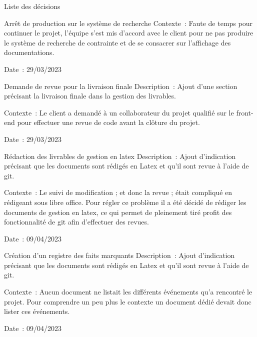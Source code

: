 \documentclass[]{article}
\begin{document}
{\begin{section}{Liste des décisions}
\begin{subsection}{Arrêt de production sur le système de recherche}
     Contexte : Faute de temps pour continuer le projet, l’équipe s’est mis d’accord avec le client pour ne pas produire le système de recherche de contrainte et de se consacrer sur l’affichage des documentations.

     Date : 29/03/2023
 \end{subsection}
 \newpage
 \begin{subsection}{Demande de revue pour la livraison finale}
     Description : Ajout d’une section précisant la livraison finale dans la gestion des livrables.

     Contexte : Le client a demandé à un collaborateur du projet qualifié sur le front-end pour effectuer une revue de code avant la clôture du projet.

     Date : 29/03/2023
 \end{subsection}

 \begin{subsection}{Rédaction des livrables de gestion en latex}
    Description : Ajout d'indication précisant que les documents sont rédigés en Latex et qu'il sont revue à l'aide de git.

    Contexte : Le suivi de modification ; et donc la revue ; était compliqué en rédigeant sous libre office. Pour régler ce problème il a été décidé de rédiger
    les documents de gestion en latex, ce qui permet de pleinement tiré profit des fonctionnalité de git afin d'effectuer des revues.

    Date : 09/04/2023
\end{subsection}

\begin{subsection}{Création d'un registre des faits marquants}
    Description : Ajout d'indication précisant que les documents sont rédigés en Latex et qu'il sont revue à l'aide de git.

    Contexte : Aucun document ne listait les différents événements qu'a rencontré le projet. Pour comprendre un peu plus le contexte un document dédié devait donc lister ces événements.

    Date : 09/04/2023
\end{subsection}
\end{section}
}
\end{document}
